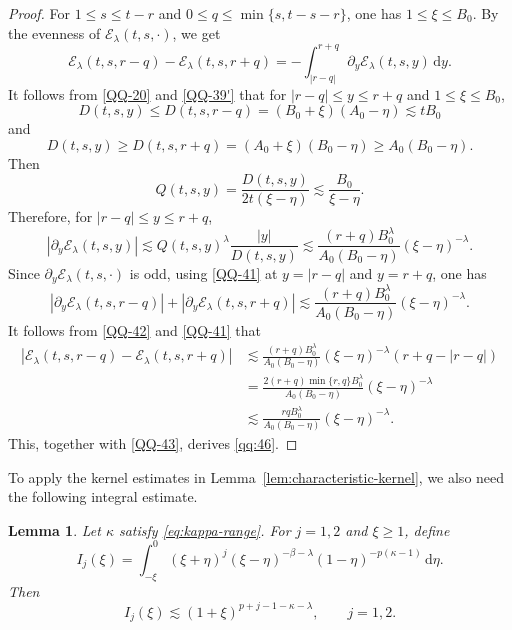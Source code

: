 \documentclass[11pt,twoside]{article}
\newcommand{\p}{\partial}
\newcommand{\f}{\frac}
\newcommand{\dd}{\,\mathrm{d}}
\newcommand{\Ecal}{\mathcal E}
\theoremstyle{plain}
\newtheorem{lemma}[theorem]{Lemma}
\theoremstyle{definition}
\theoremstyle{remark}
\numberwithin{equation}{section}
\begin{document}
\begin{proof}
For $1\leq s\leq t-r$ and
$0\leq q\leq\min\{s,t-s-r\}$, one has $1\leq\xi\leq B_0$.
By the evenness of $\Ecal_\lambda(t,s,\cdot)$, we get
\begin{equation}\label{QQ-42}
\Ecal_\lambda(t,s,r-q)-\Ecal_\lambda(t,s,r+q)
=
-\int_{|r-q|}^{r+q}
\p_y\Ecal_\lambda(t,s,y)\dd y.
\end{equation}
It follows from \eqref{QQ-20} and \eqref{QQ-39'} that for $|r-q|\leq y\leq r+q$ and $1\leq\xi\leq B_0$,
\[
D(t,s,y)
\leq
D(t,s,r-q)
=
(B_0+\xi)(A_0-\eta)
\lesssim
tB_0
\]
and
\[
D(t,s,y)
\geq
D(t,s,r+q)
=
(A_0+\xi)(B_0-\eta)\geq A_0(B_0-\eta).
\]
Then
\[
Q(t,s,y)=
\f{D(t,s,y)}{2t(\xi-\eta)}
\lesssim
\f{B_0}{\xi-\eta}.
\]
Therefore, for $|r-q|\leq y\leq r+q$,
\begin{equation}\label{QQ-41}
|\p_y\Ecal_\lambda(t,s,y)|\lesssim
Q(t,s,y)^\lambda
\f{|y|}{D(t,s,y)}
\lesssim
\f{(r+q)B_0^\lambda}
{A_0(B_0-\eta)}
(\xi-\eta)^{-\lambda}
.
\end{equation}
Since $\p_y\Ecal_\lambda(t,s,\cdot)$ is odd, using
\eqref{QQ-41} at $y=|r-q|$ and $y=r+q$, one has
\begin{equation}\label{QQ-43}
|\p_y\Ecal_\lambda(t,s,r-q)|
+
|\p_y\Ecal_\lambda(t,s,r+q)|
\lesssim
\f{(r+q)B_0^\lambda}
{A_0(B_0-\eta)}
(\xi-\eta)^{-\lambda}.
\end{equation}
It follows from \eqref{QQ-42} and \eqref{QQ-41} that
\[
\begin{aligned}
\left|
\Ecal_\lambda(t,s,r-q)
-
\Ecal_\lambda(t,s,r+q)
\right|&\lesssim
\f{(r+q)B_0^\lambda}
{A_0(B_0-\eta)}
(\xi-\eta)^{-\lambda}
\left(r+q-|r-q|\right)\\
&=\f{2(r+q)\min\{r,q\}B_0^\lambda}
{A_0(B_0-\eta)}
(\xi-\eta)^{-\lambda}\\
&\lesssim
\f{rqB_0^\lambda}
{A_0(B_0-\eta)}
(\xi-\eta)^{-\lambda}.
\end{aligned}
\]
This, together with \eqref{QQ-43}, derives \eqref{qq:46}.
\end{proof}


To apply the kernel estimates in Lemma~\ref{lem:characteristic-kernel},
we also need the following integral estimate.

\begin{lemma}
\label{lem:characteristic-integral}
Let $\kappa$ satisfy \eqref{eq:kappa-range}. For $j=1,2$ and
$\xi\geq1$, define
\[
I_j(\xi)
=
\int_{-\xi}^{0}
(\xi+\eta)^j
(\xi-\eta)^{-\beta-\lambda}
(1-\eta)^{-p(\kappa-1)}\dd\eta.
\]
Then
\begin{equation}
\label{eq:Ij}
I_j(\xi)
\lesssim
(1+\xi)^{p+j-1-\kappa-\lambda},
\qquad j=1,2.
\end{equation}
\end{lemma}
\end{document}
